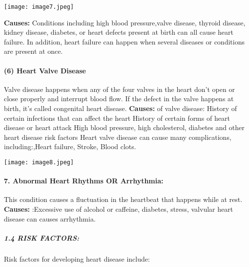 \documentclass[
]{article}
\begin{document}
\texttt{[image: image7.jpeg]}

\textbf{Causes:} Conditions including high blood pressure,valve disease,
thyroid disease, kidney disease, diabetes, or heart defects present at
birth can all cause heart failure. In addition, heart failure can happen
when several diseases or conditions are present at once.

\hypertarget{heart-valve-disease}{%
\paragraph{(6) Heart Valve Disease}\label{heart-valve-disease}}

Valve disease happens when any of the four valves in the heart don't
open or close properly and interrupt blood flow. If the defect in the
valve happens at birth, it's called congenital heart disease.
\textbf{Causes:} of valve disease: History of certain infections that
can affect the heart History of certain forms of heart disease or heart
attack High blood pressure, high cholesterol, diabetes and other heart
disease risk factors Heart valve disease can cause many complications,
including:,Heart failure, Stroke, Blood clots.

\texttt{[image: image8.jpeg]}

\hypertarget{abnormal-heart-rhythms-or-arrhythmia}{%
\paragraph{7. Abnormal Heart Rhythms OR
Arrhythmia:}\label{abnormal-heart-rhythms-or-arrhythmia}}

This condition causes a fluctuation in the heartbeat that happens while
at rest. \textbf{Causes:} :Excessive use of alcohol or caffeine,
diabetes, stress, valvular heart disease can causes arrhythmia.

\hypertarget{risk-factors}{%
\subparagraph{1.4 RISK FACTORS:}\label{risk-factors}}

Risk factors for developing heart disease include:
\end{document}
